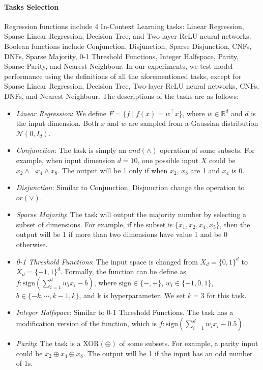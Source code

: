 \documentclass[letterpaper]{article} %
\begin{document}
\paragraph{Tasks Selection}
Regression functions \cite{garg-2022-what} include 4 In-Context Learning tasks: Linear Regression, Sparse Linear Regression, Decision Tree, and Two-layer ReLU neural networks. Boolean functions \cite{bhattamishra-2024-understanding} include Conjunction, Disjunction, Sparse Disjunction, CNFs, DNFs, Sparse Majority, 0-1 Threshold Functions, Integer Halfspace, Parity, Sparse Parity, and Nearest Neighbour. In our experiments, we test model performance using the definitions of all the aforementioned tasks, except for Sparse Linear Regression, Decision Tree, Two-layer ReLU neural networks, CNFs, DNFs, and Nearest Neighbour. The descriptions of the tasks are as follows:

\begin{itemize}
    \item \textit{Linear Regression}: We define $F = \{ f \mid f(x) = w^\top x \}$, where $w \in \mathbb{R}^d$ and $d$ is the input dimension. Both $x$ and $w$ are sampled from a Gaussian distribution $\mathcal{N}(0, I_d)$.
    \item \textit{Conjunction}: The task is simply an $and(\wedge)$ operation of some subsets. For example, when input dimension $d=10$, one possible input $X$ could be $x_2 \wedge \neg x_4 \wedge x_8$. The output will be 1 only if when $x_2$, $x_8$ are 1 and $x_4$ is 0.
    \item \textit{Disjunction}: Similar to Conjunction, Disjunction change the operation to $or(\vee)$.
    \item \textit{Sparse Majority}: The task will output the majority number by selecting a subset of dimensions. For example, if the subset is $\{x_1, x_2, x_4, x_5\}$, then the output will be 1 if more than two dimensions have value 1 and be 0 otherwise.
    \item \textit{0-1 Threshold Functions}: The input space is changed from $X_d = \{0, 1\}^d$ to $X_d = \{-1, 1\}^d$. Formally, the function can be define as $f: \text{sign}\left(\sum_{i=1}^{d} w_i x_i - b\right)$, where $\text{sign} \in \{-,+\}$, $w_i \in \{-1, 0, 1\}$, $b \in \{-k, \cdots, k-1, k\}$, and k is hyperparameter. We set $k = 3$ for this task.
    \item \textit{Integer Halfspace}: Similar to 0-1 Threshold Functions. The task has a modification version of the function, which is $f: \text{sign}\left(\sum_{i=1}^{d} w_i x_i - 0.5\right)$.
    \item \textit{Parity}: The task is a XOR$(\oplus)$ of some subsets. For example, a parity input could be $x_2 \oplus x_4 \oplus x_8$. The output will be 1 if the input has an odd number of 1s.
\end{itemize}
\end{document}
